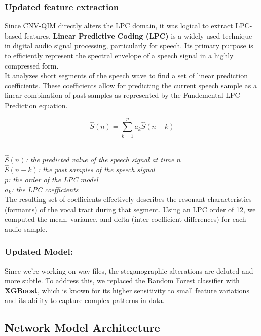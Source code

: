 \documentclass[12pt]{article}
\begin{document}
\subsubsection{Updated feature extraction}
Since CNV-QIM directly alters the LPC domain, it was logical to extract LPC-based features.
\textbf{Linear Predictive Coding (LPC)} is a widely used technique in digital audio signal processing, particularly for speech. Its primary purpose is to efficiently represent the spectral envelope of a speech signal in a highly compressed form.\vspace{0.3cm} \\
It analyzes short segments of the speech wave to find a set of linear prediction coefficients. These coefficients allow for predicting the current speech sample as a linear combination of past samples as represented by the Fundemental LPC Prediction equation.

\begin{equation}
    \hat{S}(n)= \sum_{k=1}^{p} a_{k} \hat{S}(n-k)
\end{equation}

\textit{\\$\hat{S}(n)$: the predicted value of the speech signal at time $n$ \\
$\hat{S}(n-k)$: the past samples of the speech signal \\
$p$: the order of the LPC model \\
$a_{k}$: the LPC coefficients \vspace{0.3cm} \\
}
The resulting set of coefficients effectively describes the resonant characteristics (formants) of the vocal tract during that segment.
Using an LPC order of 12, we computed the mean, variance, and delta (inter-coefficient differences) for each audio sample.

\subsubsection{Updated Model:}
Since we're working on wav files, the steganographic alterations are deluted and more subtle. To address this, we replaced the Random Forest classifier with \textbf{XGBoost}, which is known for its higher sensitivity to small feature variations and its ability to capture complex patterns in data. 

\newpage

\subsection{Network Model Architecture}
\end{document}
